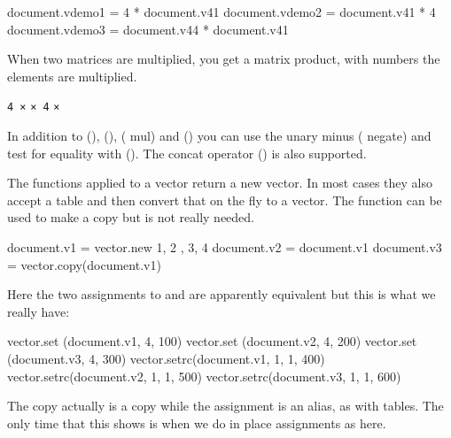 \startbuffer
\startluacode
document.vdemo1 = 4 * document.v41
document.vdemo2 = document.v41 * 4
document.vdemo3 = document.v44 * document.v41
\stopluacode
\stopbuffer

\typebuffer[option=TEX] \getbuffer

When two matrices are multiplied, you get a matrix product, with numbers the
elements are multiplied.

\startlinecorrection
{} {}
    {} {\hbox{\tt 4 ×}}
    {} {\hbox{\tt × 4}}
    {} {\hbox{\tt ×  }}
\stopcombination
\stoplinecorrection

In addition to \type {+} (), \type {-} (), \type {*} (\type
{mul}) and \type {/} () you can use the unary minus \type {-} (\type
{negate}) and test for equality with \type {=} (). The concat
operator  () is also supported.

The functions applied to a vector return a new vector. In most cases they also
accept a table and then convert that on the fly to a vector. The 
function can be used to make a copy but is not really needed.

\startbuffer
\startluacode
document.v1 = vector.new { { 1, 2 }, { 3, 4 } }
document.v2 = document.v1
document.v3 = vector.copy(document.v1)
\stopluacode
\stopbuffer

\typebuffer[option=TEX] \getbuffer

Here the two assignments to  and  are apparently
equivalent but this is what we really have:

\startlines
{}
\stoplines

\startbuffer
\startluacode
vector.set  (document.v1, 4, 100)
vector.set  (document.v2, 4, 200)
vector.set  (document.v3, 4, 300)
vector.setrc(document.v1, 1, 1, 400)
vector.setrc(document.v2, 1, 1, 500)
vector.setrc(document.v3, 1, 1, 600)
\stopluacode
\stopbuffer

\typebuffer[option=TEX] \getbuffer

The copy actually is a copy while the assignment is an alias, as with tables. The
only time that this shows is when we do in place assignments as here.

